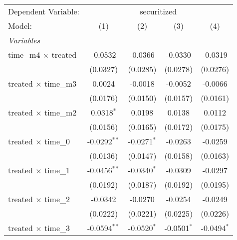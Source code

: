 \begingroup
\centering
\begin{tabular}{lcccc}
   \tabularnewline \midrule \midrule
   Dependent Variable: & \multicolumn{4}{c}{securitized}\\
   Model:                                              & (1)             & (2)                   & (3)                   & (4)\\  
   \midrule
   \emph{Variables}\\
   time\_m4 $\times$ treated                           & -0.0532         & -0.0366               & -0.0330               & -0.0319\\   
                                                       & (0.0327)        & (0.0285)              & (0.0278)              & (0.0276)\\   
   treated $\times$ time\_m3                           & 0.0024          & -0.0018               & -0.0052               & -0.0066\\   
                                                       & (0.0176)        & (0.0150)              & (0.0157)              & (0.0161)\\   
   treated $\times$ time\_m2                           & 0.0318$^{*}$    & 0.0198                & 0.0138                & 0.0112\\   
                                                       & (0.0156)        & (0.0165)              & (0.0172)              & (0.0175)\\   
   treated $\times$ time\_0                            & -0.0292$^{**}$  & -0.0271$^{*}$         & -0.0263               & -0.0259\\   
                                                       & (0.0136)        & (0.0147)              & (0.0158)              & (0.0163)\\   
   treated $\times$ time\_1                            & -0.0456$^{**}$  & -0.0340$^{*}$         & -0.0309               & -0.0297\\   
                                                       & (0.0192)        & (0.0187)              & (0.0192)              & (0.0195)\\   
   treated $\times$ time\_2                            & -0.0342         & -0.0270               & -0.0254               & -0.0249\\   
                                                       & (0.0222)        & (0.0221)              & (0.0225)              & (0.0226)\\   
   treated $\times$ time\_3                            & -0.0594$^{**}$  & -0.0520$^{*}$         & -0.0501$^{*}$         & -0.0494$^{*}$\\   

\end{tabular}
